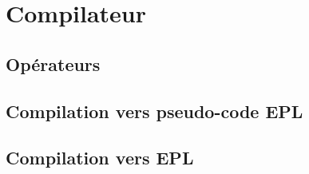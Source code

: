 \chapter{Compilateur}
\begin{preamble}

\end{preamble}

\section{Opérateurs}
\section{Compilation vers pseudo-code EPL}

\section{Compilation vers EPL}